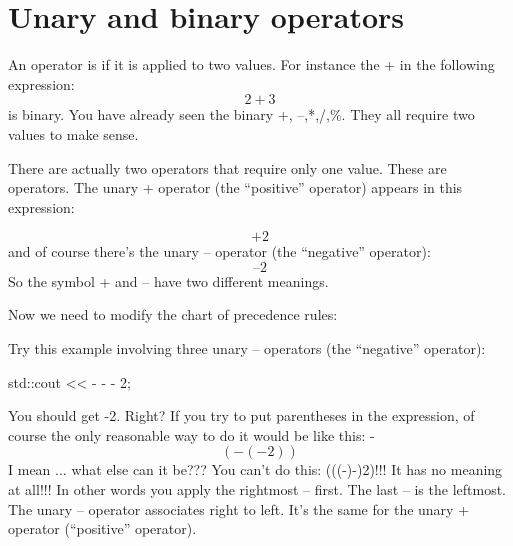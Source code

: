 %
%
%
%
%
%


\newpage\section{Unary and binary operators}
An operator is  if it is applied to two values. For instance the +
in the following expression:
\[2+3\]
is binary. You have already seen the binary +, –,*,/,\%. They all require
two values to make sense.

There are actually two operators that require only one value. These are  operators. The unary + operator (the “positive” operator)
appears in this expression:



\[+2\]
and of course there's the unary – operator (the “negative” operator):
\[–2\]
So the symbol + and – have two different meanings.

Now we need to modify the chart of precedence rules:

  
\noindent{}

%

Try this example involving three unary – operators (the “negative”
operator):
\begin{console}
std::cout << - - - 2;
\end{console}
You should get -2. Right? If you try to put parentheses in the expression,
of course the only reasonable way to do it would be like this:
-\[(-(-2))\]
I mean ... what else can it be??? You can't do this: (((-)-)2)!!! It has
no meaning at all!!!
In other words you apply the rightmost – first. The last – is the leftmost.
The unary – operator associates right to left. It's the same for the unary +
operator (“positive” operator).


